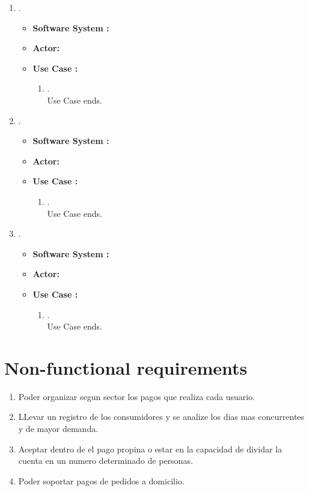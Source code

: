 \documentclass{article}
\begin{document}
\begin{enumerate}
    \item .
   \begin{itemize}
        \item \textbf{Software System :} 
        \item \textbf{Actor: } 
        \item \textbf{Use Case : } 
        \begin{enumerate}
            \item .\\
            Use Case ends.
        \end{enumerate}
    \end{itemize}


 \item .
   \begin{itemize}
        \item \textbf{Software System :} 
        \item \textbf{Actor: } 
        \item \textbf{Use Case : } 
        \begin{enumerate}
            \item .\\
            Use Case ends.
        \end{enumerate}
    \end{itemize}
    
    \item .
   \begin{itemize}
        \item \textbf{Software System :} 
        \item \textbf{Actor: } 
        \item \textbf{Use Case : } 
        \begin{enumerate}
            \item .\\
            Use Case ends.
        \end{enumerate}
    \end{itemize}
    
\end{enumerate}

\section{Non-functional requirements}
\begin{enumerate}
    \item Poder organizar segun sector los pagos que realiza cada usuario.
    \item LLevar un registro de los consumidores y se analize los dias mas concurrentes y de mayor demanda.
    \item Aceptar dentro de el pago propina o estar en la capacidad de dividar la cuenta en un numero determinado de personas.
    \item Poder soportar pagos de pedidos a domicilio.
\end{enumerate}
\end{document}
